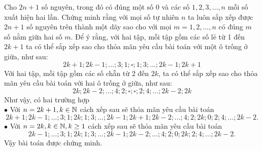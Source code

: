 \begin{ex}%
   	Cho $2n+1$ số nguyên, trong đó có đúng một số $0$ và các số $1,2,3,...,n$ mỗi số xuất hiện hai lần. Chứng minh rằng với mọi số tự nhiên $n$ ta luôn sắp xếp được $2n+1$ số nguyên trên thành một dãy sao cho với mọi $m=1,2,...,n$ có đúng $m$ số nằm giữa hai số $m$.
\loigiai
    {Để ý rằng, với hai tập, mỗi tập gồm các số lẻ từ 1 đến $2k+1$ ta có thể sắp xếp sao cho thỏa mãn yêu cầu bài toán với một ô trống ở giữa, như sau:
    $$2k+1; 2k-1; ...; 3; 1; \square; 1; 3; ...; 2k-1; 2k+1 $$
    Với hai tập, mỗi tập gồm các số chẵn từ 2 đến $2k$, ta có thể sắp xếp sao cho thỏa mãn yêu cầu bài toán với hai ô trống ở giữa, như sau:
    $$2k; 2k-2; ...; 4; 2; \square; \square; 2; 4; ...; 2k-2; 2k $$
    Như vậy, có hai trường hợp\\
    $\bullet$ Với $n=2k+1,k\in \Bbb N$ cách xếp sau sẽ thỏa mãn yêu cầu bài toán
    $$2k+1; 2k-1; ...; 3; 1; 2k; 1; 3; ...; 2k-1; 2k+1; 2k-2; ...; 4; 2; 2k; 0; 2; 4; ...; 2k-2.$$
    $\bullet$ Với $n=2k,k\in \Bbb N,k\ge 1$ cách xếp sau sẽ thỏa mãn yêu cầu bài toán
    $$2k-1; ...; 3; 1; 2k; 1; 3; ...; 2k-1; 2k-2; ...; 4; 2;0; 2k; 2; 4; ...; 2k-2.$$
    Vậy bài toán được chứng minh.
    }
\end{ex}
